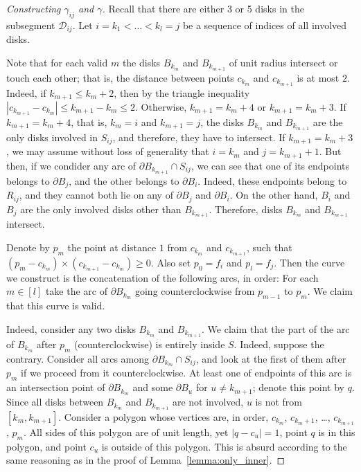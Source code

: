 \begin{proof}[Constructing $\gamma_{ij}$ and $\gamma$]
Recall that there are either 3 or 5 disks in the subsegment $\mathcal{D}_{ij}$.
Let $i = k_1 < \ldots < k_l = j$ be a sequence of indices of all involved disks. %

Note that for each valid $m$ the disks $B_{k_m}$ and $B_{k_{m+1}}$ of unit radius intersect or touch each other; that is, the distance between points $c_{k_m}$ and $c_{k_{m+1}}$ is at most $2$. Indeed, if $k_{m+1}\leq k_m + 2$, then by the triangle inequality $|c_{k_{m+1}} - c_{k_m}|\leq k_{m+1}-k_m\leq 2$. 
Otherwise, $k_{m+1} = k_m + 4$ or $k_{m+1} = k_m + 3$. If $k_{m+1} = k_m + 4$, that is, $k_m = i$ and $k_{m+1} = j$, the disks $B_{k_m}$ and $B_{k_{m+1}}$ are the only disks involved in $S_{ij}$, and therefore, they have to intersect. If $k_{m+1} = k_m + 3$, we may assume without loss of generality that $i = k_m$ and $j = k_{m+1} + 1$.
But then, if we condider any arc of $\partial B_{k_{m+1}}\cap S_{ij}$, we can see that one of its endpoints belongs to $\partial B_j$, and the other belongs to $\partial B_i$. Indeed, these endpoints belong to $R_{ij}$, and they cannot both lie on any of $\partial{B_j}$ and $\partial{B_i}$. On the other hand, $B_i$ and $B_j$ are the only involved disks other than $B_{k_{m+1}}$. Therefore, disks $B_{k_m}$ and $B_{k_{m+1}}$ intersect.

Denote by $p_m$ the point at distance $1$ from $c_{k_m}$ and $c_{k_{m+1}}$, such that $(p_m - c_{k_m})\times(c_{k_{m+1}} - c_{k_m})\geq 0$.
Also set $p_0 = f_i$ and $p_l = f_j$. Then the curve we construct is the concatenation of the following arcs, in order: For each $m\in[l]$ take the arc of $\partial B_{k_m}$ going counterclockwise from $p_{m-1}$ to $p_m$. We claim that this curve is valid.

Indeed, consider any two disks $B_{k_m}$ and $B_{k_{m+1}}$. We claim that the part of the arc of $B_{k_m}$ after $p_m$ (counterclockwise) is entirely inside $S$. Indeed, suppose the contrary.
Consider all arcs among $\partial{B_{k_m}}\cap S_{ij}$, and look at the first of them after $p_m$ if we proceed from it counterclockwise. At least one of endpoints of this arc is an intersection point of $\partial{B_{k_m}}$ and some $\partial{B_u}$ for $u\neq k_{m+1}$; denote this point by $q$.
Since all disks between $B_{k_m}$ and $B_{k_{m+1}}$ are not involved, $u$ is not from $[k_m, k_{m+1}]$. Consider a polygon whose vertices are, in order, $c_{k_m}$, $c_{k_m + 1}$, \ldots, $c_{k_{m+1}}$, $p_m$. All sides of this polygon are of unit length, yet $|q - c_u| = 1$, point $q$ is in this polygon, and point $c_u$ is outside of this polygon. This is absurd according to the same reasoning as in the proof of Lemma~\ref{lemma:only_inner}.


\end{proof}
